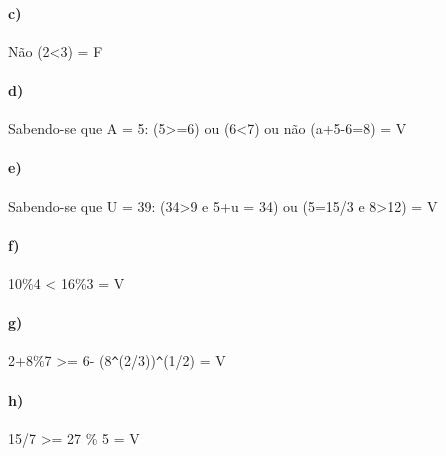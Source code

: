 \documentclass[pdftex,a4paper,12pt,brazil]{article} %
\begin{document}
\paragraph{c)} Não (2<3) = F

\paragraph{d)} Sabendo-se que A = 5: (5>=6) ou (6<7) ou não (a+5-6=8) = V

\paragraph{e)} Sabendo-se que U = 39: (34>9 e 5+u = 34) ou (5=15/3 e 8>12) = V

\paragraph{f)} 10\%4 < 16\%3 = V

\paragraph{g)} 2+8\%7 >= 6- (8\verb!^!(2/3))\verb!^!(1/2) = V

\paragraph{h)} 15/7 >= 27 \% 5 = V







%


\end{document}
